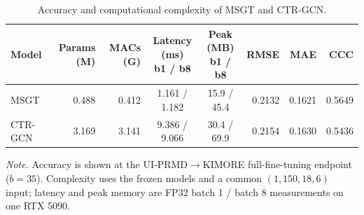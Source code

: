 \begin{table}[ht]
\centering
\caption{Accuracy and computational complexity of MSGT and CTR-GCN.}
\label{tab:accuracy-complexity}
\scriptsize
\setlength{\tabcolsep}{3.1pt}
\begin{tabular}{lrrccrrr}
\toprule
Model & Params (M) & MACs (G) & \shortstack{Latency (ms)\\b1 / b8} & \shortstack{Peak (MB)\\b1 / b8} & RMSE & MAE & CCC \\
\midrule
MSGT & 0.488 & 0.412 & 1.161 / 1.182 & 15.9 / 45.4 & 0.2132 & 0.1621 & 0.5649 \\
CTR-GCN & 3.169 & 3.141 & 9.386 / 9.066 & 30.4 / 69.9 & 0.2154 & 0.1630 & 0.5436 \\
\bottomrule
\end{tabular}
\vspace{3pt}

\parbox{0.98\textwidth}{\footnotesize \textit{Note.} Accuracy is shown at the UI-PRMD$\rightarrow$KIMORE full-fine-tuning endpoint ($b=35$). Complexity uses the frozen models and a common $(1,150,18,6)$ input; latency and peak memory are FP32 batch 1 / batch 8 measurements on one RTX 5090.}
\end{table}
